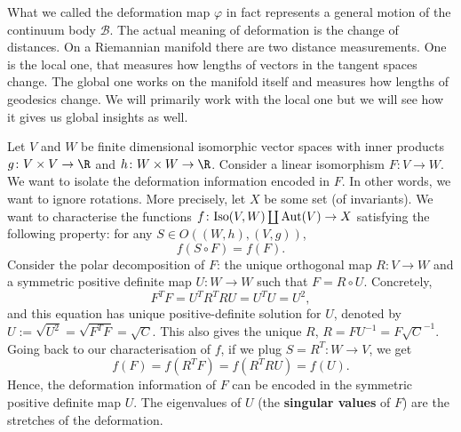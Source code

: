 \begin{discussion}
  What we called the deformation map $\varphi$ in fact represents a general
  motion of the continuum body $\mathcal{B}$.
  The actual meaning of deformation is the change of distances.
  On a Riemannian manifold there are two distance measurements.
  One is the local one, that measures how lengths of vectors in the tangent
  spaces change.
  The global one works on the manifold itself and measures how lengths of
  geodesics change.
  We will primarily work with the local one but we will see how it gives us
  global insights as well.
\end{discussion}
\begin{discussion}
  Let $V$ and $W$ be finite dimensional isomorphic vector spaces with inner
  products $g \colon V \times V \to \R$ and $h \colon W \times W \to \R$.
  Consider a linear isomorphism $F \colon V \to W$.
  We want to isolate the deformation information encoded in $F$.
  In other words, we want to ignore rotations.
  More precisely, let $X$ be some set (of invariants).
  We want to characterise the functions
  $f \colon {\rm Iso}(V, W) \coprod {\rm Aut}(V) \to X$
  satisfying the following property: for any $S \in O((W, h), (V, g))$,
  \begin{equation}
    f(S \circ F) = f(F).
  \end{equation}
  Consider the polar decomposition of $F$:
  the unique orthogonal map $R \colon V \to W$ and a
  symmetric positive definite map $U \colon W \to W$ such that
  $F = R \circ U$.
  Concretely,
  \begin{equation}
    F^T F = U^T R^T R U = U^T U = U^2,
  \end{equation}
  and this equation has unique positive-definite solution for $U$, denoted by
  $U := \sqrt{U^2} = \sqrt{F^T F} = \sqrt{C}$.
  This also gives the unique $R$, $R = F U^{-1} = F \sqrt{C}^{-1}$.
  Going back to our characterisation of $f$, if we plug
  $S = R^{T} \colon W \to V$,
  we get
  \begin{equation}
    f(F) = f(R^T F) = f(R^T R U) = f(U).
  \end{equation}
  Hence, the deformation information of $F$ can be encoded in the symmetric
  positive definite map $U$.
  The eigenvalues of $U$ (the \textbf{singular values} of $F$)
  are the stretches of the deformation.
\end{discussion}
